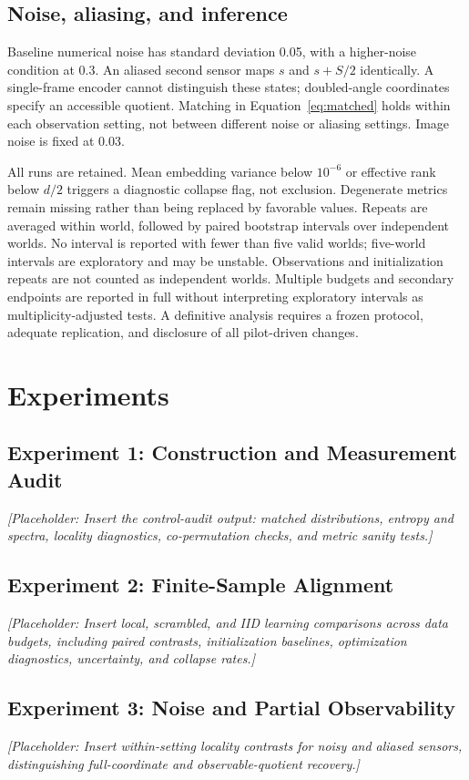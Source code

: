 \documentclass[11pt,a4paper]{article}
\newcommand{\placeholder}[1]{\par\medskip\noindent\textit{[Placeholder: #1]}\par\medskip}
\begin{document}
\subsection{Noise, aliasing, and inference}
Baseline numerical noise has standard deviation 0.05, with a higher-noise condition at 0.3. An aliased second sensor maps $s$ and $s+S/2$ identically. A single-frame encoder cannot distinguish these states; doubled-angle coordinates specify an accessible quotient. Matching in Equation~\ref{eq:matched} holds within each observation setting, not between different noise or aliasing settings. Image noise is fixed at 0.03.

All runs are retained. Mean embedding variance below $10^{-6}$ or effective rank below $d/2$ triggers a diagnostic collapse flag, not exclusion. Degenerate metrics remain missing rather than being replaced by favorable values. Repeats are averaged within world, followed by paired bootstrap intervals over independent worlds. No interval is reported with fewer than five valid worlds; five-world intervals are exploratory and may be unstable. Observations and initialization repeats are not counted as independent worlds. Multiple budgets and secondary endpoints are reported in full without interpreting exploratory intervals as multiplicity-adjusted tests. A definitive analysis requires a frozen protocol, adequate replication, and disclosure of all pilot-driven changes.

\section{Experiments}
\subsection{Experiment 1: Construction and Measurement Audit}
\placeholder{Insert the control-audit output: matched distributions, entropy and spectra, locality diagnostics, co-permutation checks, and metric sanity tests.}
\subsection{Experiment 2: Finite-Sample Alignment}
\placeholder{Insert local, scrambled, and IID learning comparisons across data budgets, including paired contrasts, initialization baselines, optimization diagnostics, uncertainty, and collapse rates.}
\subsection{Experiment 3: Noise and Partial Observability}
\placeholder{Insert within-setting locality contrasts for noisy and aliased sensors, distinguishing full-coordinate and observable-quotient recovery.}
\end{document}
